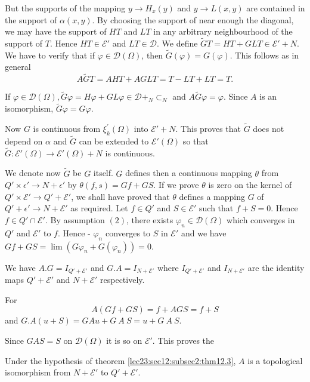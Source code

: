 But the supports of the mapping $y \to H_x (y)$ and $y \to L (x, y)$
are contained in the support of  $\alpha(x, y)$. By choosing the
support of near enough the diagonal, we may have the support of $HT$ and $LT$ in any arbitrary neighbourhood of the support
of $T$. Hence $HT \in \mathscr{E}'$ and $LT \in
\mathscr{D}$. We define $\tilde{G}T = HT + GLT \in
\mathscr{E}' + N$. We have to verify that if $\varphi \in
\mathscr{D} (\Omega)$, then $\tilde{G}(\varphi) = G (\varphi)$. This
follows as in general  
$$
A \tilde{G}T = AHT + AGLT = T - LT + LT = T.
$$

If $\varphi \in \mathscr{D} (\Omega), \tilde{G} \varphi = H
\varphi + GL \varphi \in \mathscr{D} + _N \subset_N$ and $A
\tilde{G} \varphi = \varphi$. Since $A$ is an isomorphism, $\tilde{G}
\varphi = G \varphi$. 

Now $G$ is continuous from $\xi^{'}_{k}(\Omega)$ into $\mathscr{E'} +
N$. This proves that $\tilde{G}$ does not depend on $\alpha$ and
$\tilde{G}$ can be extended to $\mathscr{E}' (\Omega)$ so that
$\tilde{G} : \mathscr{E}' (\Omega) \to \mathscr{E'} (\Omega) + N$ is
continuous. 

We denote now $\tilde{G}$ be $G$ itself. $G$ defines then a continuous
mapping $\theta$ from $Q' \times \epsilon' \to N + \epsilon'$ by
$\theta (f, s) = Gf + GS$. If we prove $\theta$ is zero on the kernel
of $Q' \times \mathscr{E'} \to Q' + \mathscr{E'}$, we shall have
proved that $\theta$ defines a mapping $G$ of $Q' + \epsilon' \to N
+ \mathscr{E}'$  as required. Let $f \in Q'$ and $S
\in \mathscr{E'}$ such that $f + S = 0$. Hence $f \in
Q' \cap \mathscr{E}'$. By assumption $(2)$, there exists $\varphi_n
\in \mathscr{D} (\Omega)$ which converges in $Q'$ and
$\mathscr{E'}$ to $f$. Hence - $\varphi_n$ converges to $S$ in
$\mathscr{E}'$ and we have $Gf + GS = \lim (G \varphi_n + G(\varphi_n)) = 0$.\pageoriginale 

\begin{coro*}
  We have $A. G = I_{Q' + \mathscr{E'} }$ and $G. A = I_{N +
    \mathscr{E'}}$ where $I_{Q' + \mathscr{E}'}$ and $I_{N +
    \mathscr{E'} }$ are the identity maps $Q' + \mathscr{E'}$ and $N +
  \mathscr{E'}$ respectively. 
\end{coro*}
For
$$
A(Gf + GS) = f + AGS = f + S
$$
and $G. A (u + S) = G Au + G~A~S = u + G~A~S$.

Since $GAS = S$ on $\mathscr{D} (\Omega)$ it is so on
$\mathscr{E'}$. This proves the  
\begin{theorem}\label{lec23:sec12:subsec2:thm12.4}%
Under the hypothesis of theorem \ref{lec23:sec12:subsec2:thm12.3}, $A$ is a topological isomorphism
from $N + \mathscr{E'}$ to $Q' + \mathscr{E'}$. 
\end{theorem}

